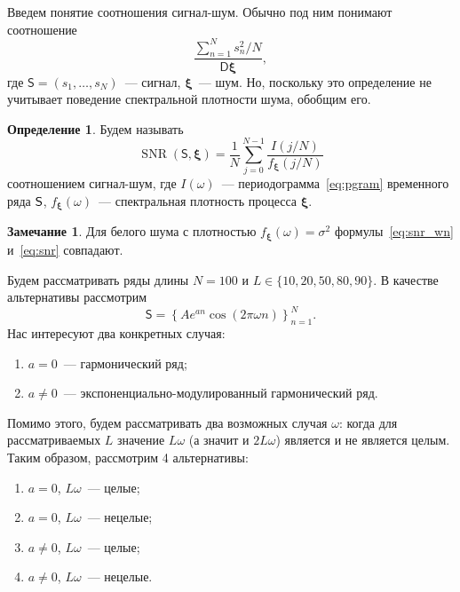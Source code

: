 \documentclass[specialist,
substylefile = spbu_report.rtx,
subf,12pt]{disser}
\theoremstyle{definition}
\newtheorem{definition}{Определение}[chapter]
\newtheorem{remark}{Замечание}[chapter]
\begin{document}
Введем понятие соотношения сигнал-шум. Обычно под ним понимают соотношение
\begin{equation}\label{eq:snr_wn}
	\frac{\sum\limits_{n=1}^N s^2_n/N}{\mathsf{D}{\bm\xi}},
\end{equation}
где $\mathsf{S}=(s_1,\ldots,s_N)$~--- сигнал, $\bm{\xi}$~--- шум. Но, поскольку это определение не учитывает поведение спектральной плотности шума, обобщим его.

\begin{definition}
	Будем называть
	\begin{equation}\label{eq:snr}
		\operatorname{SNR}(\mathsf{S}, \bm\xi)=\frac1N\sum_{j=0}^{N-1}\frac{I(j/N)}{f_{\bm{\xi}}(j/N)}
	\end{equation}
	соотношением сигнал-шум, где $I(\omega)$~--- периодограмма~\eqref{eq:pgram} временного ряда $\mathsf{S}$, $f_{\bm\xi}(\omega)$~--- спектральная плотность процесса $\bm\xi$.
\end{definition}

\begin{remark}
	Для белого шума с плотностью $f_{\bm\xi}(\omega)=\sigma^2$ формулы~\eqref{eq:snr_wn} и~\eqref{eq:snr} совпадают.
\end{remark}

Будем рассматривать ряды длины $N=100$ и $L\in\{10,20,50,80,90\}$. В качестве альтернативы рассмотрим
\begin{equation}\label{eq:em_harmonic}
	\mathsf{S}=\left\{Ae^{a n}\cos(2\pi\omega n)\right\}_{n=1}^N.
\end{equation}
Нас интересуют два конкретных случая:
\begin{enumerate}
	\item $a=0$~--- гармонический ряд;
	\item $a\ne0$~--- экспоненциально-модулированный гармонический ряд.
\end{enumerate}

Помимо этого, будем рассматривать два возможных случая $\omega$: когда для рассматриваемых $L$ значение $L\omega$ (а значит и $2L\omega$) является и не является целым. Таким образом, рассмотрим 4 альтернативы:
\begin{enumerate}
	\item $a=0$, $L\omega$~--- целые;
	\item $a=0$, $L\omega$~--- нецелые;
	\item $a\ne0$, $L\omega$~--- целые;
	\item  $a\ne0$, $L\omega$~--- нецелые.
\end{enumerate}
\end{document}
